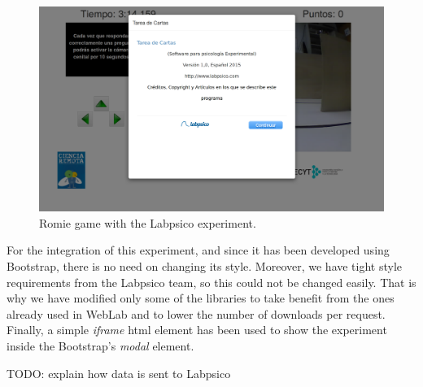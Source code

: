 \begin{figure}[ht]
	\centering
	\includegraphics[height=0.35\textheight]{fig/manuals/trivial/labpsico/labpsico-romie}
	\caption{Romie game with the Labpsico experiment.}
	\label{fig:labpsico_romie}
\end{figure}

For the integration of this experiment, and since it has been developed using Bootstrap, there is no
need on changing its style. Moreover, we have tight style requirements from the Labpsico team, so
this could not be changed easily. That is why we have modified only some of the libraries to take
benefit from the ones already used in WebLab and to lower the number of downloads per request.
Finally, a simple \emph{iframe} \acrshort{html} element has been used to show the experiment inside
the Bootstrap's \emph{modal} element.

TODO: explain how data is sent to Labpsico
